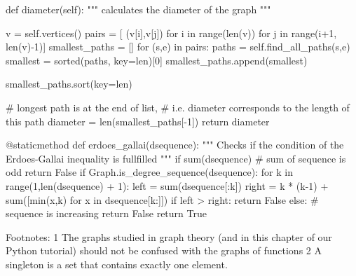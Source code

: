     def diameter(self):
        """ calculates the diameter of the graph """
        
        v = self.vertices() 
        pairs = [ (v[i],v[j]) for i in range(len(v)) for j in range(i+1, len(v)-1)]
        smallest_paths = []
        for (s,e) in pairs:
            paths = self.find_all_paths(s,e)
            smallest = sorted(paths, key=len)[0]
            smallest_paths.append(smallest)

        smallest_paths.sort(key=len)

        # longest path is at the end of list, 
        # i.e. diameter corresponds to the length of this path
        diameter = len(smallest_paths[-1])
        return diameter

    @staticmethod
    def erdoes_gallai(dsequence):
        """ Checks if the condition of the Erdoes-Gallai inequality 
            is fullfilled 
        """
        if sum(dsequence) %
            # sum of sequence is odd
            return False
        if Graph.is_degree_sequence(dsequence):
            for k in range(1,len(dsequence) + 1):
                left = sum(dsequence[:k])
                right =  k * (k-1) + sum([min(x,k) for x in dsequence[k:]])
                if left > right:
                    return False
        else:
            # sequence is increasing
            return False
        return True


Footnotes: 
1 The graphs studied in graph theory (and in this chapter of our Python tutorial) should not be confused with the graphs of functions 
2 A singleton is a set that contains exactly one element. 
